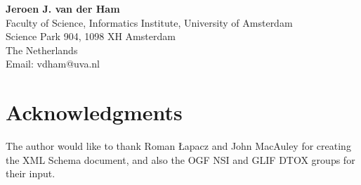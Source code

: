 \documentclass[12pt]{article}  %
\begin{document}
\textbf{Jeroen J. van der Ham} \\
Faculty of Science, Informatics Institute, University of Amsterdam \\
Science Park 904, 1098 XH  Amsterdam  \\
The Netherlands \\
Email: vdham@uva.nl \\
\section{Acknowledgments}

The author would like to thank Roman Łapacz and John MacAuley for creating the XML Schema document, and also the OGF NSI and GLIF DTOX groups for their input.


 
 

\pagebreak
\appendix
	
	
\end{document}
